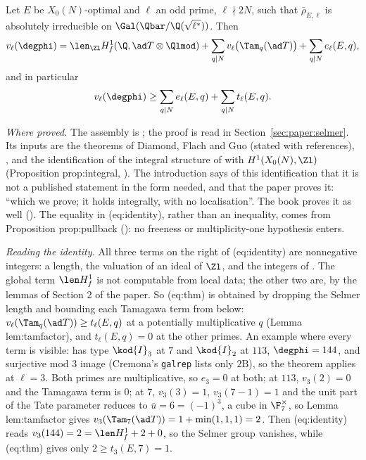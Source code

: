 \begin{sloppypar}
\begin{theorem}\label{thm:paper:main}
Let $E$ be $X_0(N)$-optimal and $\ell$ an odd prime, $\ell\nmid2N$, such that $\bar\rho_{E,\ell}$ is absolutely irreducible on $\Gal(\Qbar/\Q(\sqrt{\ell^*}))$. Then
\begin{equation}\label{eq:paper:identity}
v_\ell(\degphi)=\len_{\Zl}H^1_f(\Q,\ad T\otimes\Qlmod)+\sum_{q\mid N}v_\ell\bigl(\Tam_q(\ad T)\bigr)+\sum_{q\mid N}e_\ell(E,q),
\end{equation}
and in particular
\begin{equation}\label{eq:paper:thm}
v_\ell(\degphi)\ge\sum_{q\mid N}e_\ell(E,q)+\sum_{q\mid N}t_\ell(E,q).
\end{equation}
\end{theorem}

\noindent\emph{Where proved.} The assembly is ; the proof is read in Section~\ref{sec:paper:selmer}. Its inputs are the theorems of Diamond,
Flach and Guo (stated with references), \cite[Theorem 2.2]{ARS12}, and the identification of the integral structure of \cite{DFG04} with $H^1(X_0(N),\Zl)$
(Proposition prop:integral, ). The introduction says of this identification that it is not a published statement in the form
needed, and that the paper proves it: ``which we prove; it holds integrally, with no localisation''. The book proves it as well (). The equality in (eq:identity), rather than an inequality, comes
from Proposition prop:pullback (): no freeness or multiplicity-one hypothesis enters.

\emph{Reading the identity.} All three terms on the right of (eq:identity) are nonnegative integers: a length, the valuation of an ideal of $\Zl$, and the integers of
. The global term $\len H^1_f$ is not computable from local data; the other two are, by the lemmas of Section 2 of the paper. So (eq:thm) is
obtained by dropping the Selmer length and bounding each Tamagawa term from below: $v_\ell(\Tam_q(\ad T))\ge t_\ell(E,q)$ at a potentially multiplicative $q$ (Lemma lem:tamfactor),
and $t_\ell(E,q)=0$ at the other primes. An example where every term is visible:  has type $\kod{I}_3$ at $7$ and $\kod{I}_2$ at $113$, $\degphi=144$, and surjective mod $3$
image (Cremona's \texttt{galrep} lists only $2\mathrm B$), so the theorem applies at $\ell=3$. Both primes are multiplicative, so $e_3=0$ at both; at $113$, $v_3(2)=0$ and the Tamagawa
term is $0$; at $7$, $v_3(3)=1$, $v_3(7-1)=1$ and the unit part of the Tate parameter reduces to $\bar u=6=(-1)^3$, a cube in $\F_7^\times$, so Lemma lem:tamfactor gives
$v_3(\Tam_7(\ad T))=1+\min(1,1,1)=2$. Then (eq:identity) reads $v_3(144)=2=\len H^1_f+2+0$, so the Selmer group vanishes, while (eq:thm) gives only $2\ge t_3(E,7)=1$.


\end{sloppypar}
